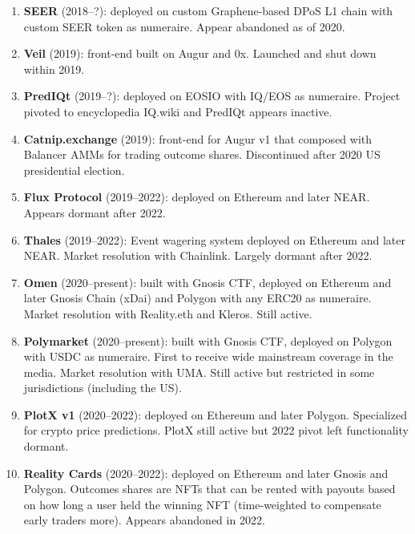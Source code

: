 \begin{enumerate}
\item \textbf{SEER} (2018--?): \depm deployed on custom Graphene-based DPoS L1 chain with custom SEER token as numeraire. Appear abandoned as of 2020.

\item \textbf{Veil} (2019): \depm front-end built on Augur and 0x. Launched and shut down within 2019.

\item \textbf{PredIQt} (2019--?): \depm deployed on EOSIO with IQ/EOS as numeraire. Project pivoted to encyclopedia IQ.wiki and PredIQt appears inactive.

\item \textbf{Catnip.exchange} (2019): \depm front-end for Augur v1 that composed with Balancer AMMs for trading outcome shares. Discontinued after 2020 US presidential election.

\item \textbf{Flux Protocol} (2019--2022): \depm deployed on Ethereum and later NEAR. Appears dormant after 2022. 

\item \textbf{Thales} (2019--2022): Event wagering system deployed on Ethereum and later NEAR. Market resolution with Chainlink. Largely dormant after 2022.

\item \textbf{Omen} (2020--present): \depm built with Gnosis CTF, deployed on Ethereum and later Gnosis Chain (xDai) and Polygon with any ERC20 as numeraire. Market resolution with Reality.eth and Kleros. Still active.

\item \textbf{Polymarket} (2020--present): \depm built with Gnosis CTF, deployed on Polygon with USDC as numeraire. First \depm to receive wide mainstream coverage in the media. Market resolution with UMA. Still active but restricted in some jurisdictions (including the US). 

\item \textbf{PlotX v1} (2020--2022): \depm deployed on Ethereum and later Polygon. Specialized for crypto price predictions. PlotX still active but 2022 pivot left \depm functionality dormant. 

\item \textbf{Reality Cards} (2020--2022): \depm deployed on Ethereum and later Gnosis and Polygon. Outcomes shares are NFTs that can be rented with payouts based on how long a user held the winning NFT (time-weighted to compensate early traders more). Appears abandoned in 2022.


\end{enumerate}
